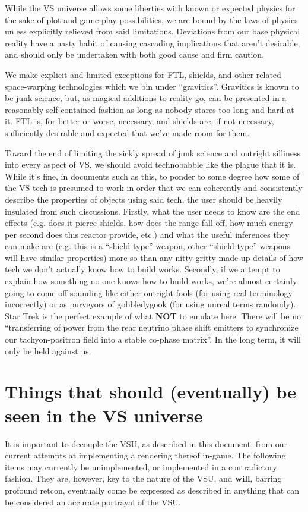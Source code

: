 \begin{itemize}
While the VS universe allows some liberties with known or
expected physics for the sake of plot and game-play possibilities, we
are bound by the laws of physics unless explicitly relieved from said
limitations. Deviations from our base physical reality have a nasty
habit of causing cascading implications that aren't desirable, and
should only be undertaken with both good cause and firm caution. 

We make explicit and limited exceptions for FTL, shields, and other
related space-warping technologies which we bin under
``gravitics''. Gravitics is known to be junk-science, but, as magical
additions to reality go, can be presented in a reasonably
self-contained fashion as long as nobody stares too long and hard at
it. FTL is, for better or worse, necessary, and shields are, if not
necessary, sufficiently desirable and expected that we've made room
for them.

Toward the end of limiting the sickly spread of junk science and
outright silliness into every aspect of VS, we should avoid
technobabble like the plague that it is. While it's fine, in documents
such as this, to ponder to some degree how some of the VS tech is
presumed to work in order that we can coherently and consistently
describe the properties of objects using said tech, the user should be
heavily insulated from such discussions. Firstly, what the user needs
to know are the end effects (e.g. does it pierce shields, how does the
range fall off, how much energy per second does this reactor provide,
etc.) and what the useful inferences they can make are (e.g. this is
a ``shield-type'' weapon, other ``shield-type'' weapons will have
similar properties) more so than any nitty-gritty made-up details of
how tech we don't actually know how to build works. Secondly, if we
attempt to explain how something no one knows how to build works,
we're almost certainly going to come off sounding like either outright
fools (for using real terminology incorrectly) or as purveyors of
gobbledygook (for using unreal terms randomly). Star Trek is the
perfect example of what {\bf NOT} to emulate here. There will be no
``transferring of power from the rear neutrino phase shift emitters
to synchronize our tachyon-positron field into a stable
co-phase matrix''. In the long term, it will only be held against us.

\end{itemize}

\section{Things that should (eventually) be seen in the VS universe}
\label{subsec:thingsseeninVSU}
It is important to decouple the VSU, as described in this document,
from our current attempts at implementing a rendering thereof
in-game. The following items may currently be unimplemented, or
implemented in a contradictory fashion. They are, however, key to the
nature of the VSU, and {\bf will}, barring profound retcon, eventually
come be expressed as described in anything that can be considered an
accurate portrayal of the VSU.

